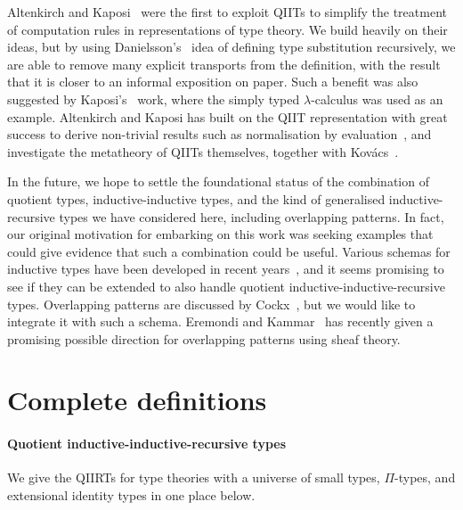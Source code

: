 \documentclass[a4paper,UKenglish,numberwithinsect,cleveref,thm-restate]{lipics-v2021}
\newcommand{\LT}[2][]{\todo[inline,author={L-T},caption={},color={pink},#1]{#2}}
\begin{document}
Altenkirch and Kaposi~\cite{Altenkirch2016a} were the first to exploit QIITs to simplify the treatment of computation rules in representations of type theory.%
We build heavily on their ideas, but by using Danielsson's~\cite{Danielsson2006} idea of defining type substitution recursively, we are able to remove many explicit transports from the definition, with the result that it is closer to an informal exposition on paper. Such a benefit was also suggested by Kaposi's~\cite{Kaposi2023} work, where the simply typed $\lambda$-calculus was used as an example. Altenkirch and Kaposi has built on the QIIT representation with great success to derive non-trivial results such as normalisation by evaluation~\cite{Altenkirch2017}, and investigate the metatheory of QIITs themselves, together with Kov\'acs~\cite{Kaposi2019}.

In the future, we hope to settle the foundational status of the
combination of quotient types, inductive-inductive types, and the kind
of generalised inductive-recursive types we have considered here,
including overlapping patterns. In fact, our original motivation for
embarking on this work was seeking examples that could give evidence
that such a combination could be useful.
%
Various schemas for inductive types have been developed in recent
years~\cite{Ghani2017,Kaposi2018,Kovacs2023}, and it seems
promising to see if they can be extended to also handle quotient
inductive-inductive-recursive types. Overlapping patterns are
discussed by Cockx~\cite{Cockx2014}, but we would like to integrate it
with such a schema. Eremondi and Kammar~\cite{Eremondi2025} has
recently given a promising possible direction for overlapping patterns
using sheaf theory.



\appendix

\section{Complete definitions}\label{appendix:full-def}

\paragraph*{Quotient inductive-inductive-recursive types}
We give the QIIRTs for type theories with a universe of small types, $\Pi$-types, and extensional identity types in one place below.
\end{document}
